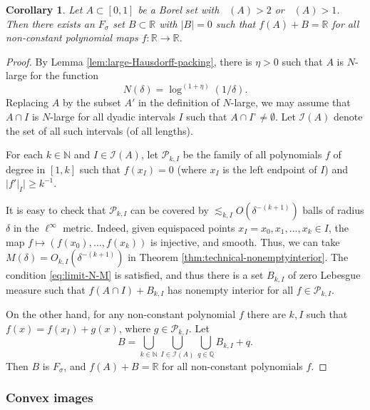 \documentclass[12pt]{amsart}
\DeclareMathOperator{\hlogdim}{dim^{\log}_H}
\DeclareMathOperator{\plogdim}{dim^{\log}_P}
\newtheorem{corollary}[theorem]{Corollary}
\def\R{{\mathbb{R}}}
\def\N{{\mathbb{N}}}
\numberwithin{theorem}{section}
\numberwithin{equation}{section}
\begin{document}
\begin{corollary} \label{cor:polynomial-images}
    Let $A\subset [0,1]$ be a Borel set with $\plogdim(A)>2$ or $\hlogdim(A)>1$. Then there exists an $F_\sigma$ set $B\subset \R$ with $|B|=0$ such that $f(A)+B=\R$ for all non-constant polynomial maps $f:\R\to \R$.
\end{corollary}
\begin{proof}
    By Lemma \ref{lem:large-Hausdorff-packing}, there is $\eta>0$ such that $A$ is $N$-large for the function
    \[
        N(\delta) = \log^{(1+\eta)}(1/\delta).
    \]
    Replacing $A$ by the subset $A'$ in the definition of $N$-large, we may assume that $A\cap I$ is $N$-large for all dyadic intervals $I$ such that $A\cap I^\circ\neq\emptyset$. Let $\mathcal{I}(A)$ denote the set of all such intervals (of all lengths).

    For each $k\in\N$ and $I\in\mathcal{I}(A)$, let $\mathcal{P}_{k,I}$ be the family of all polynomials $f$ of degree in $[1,k]$ such that $f(x_I)=0$ (where $x_I$ is the left endpoint of $I$) and $|f'|_I| \ge k^{-1}$.

    It is easy to check that $\mathcal{P}_{k,I}$ can be covered by $\lesssim_{k,I} O(\delta^{-(k+1)})$ balls of radius $\delta$ in the $\ell^\infty$ metric. Indeed, given equispaced points $x_I=x_0,x_1,\ldots,x_{k}\in I$, the map $f\mapsto (f(x_0),\ldots,f(x_{k}))$ is injective, and smooth. Thus, we can take $M(\delta)=O_{k,I}(\delta^{-(k+1)})$ in Theorem \ref{thm:technical-nonemptyinterior}. The condition \eqref{eq:limit-N-M} is satisfied, and thus there is a set $B_{k,I}$ of zero Lebesgue measure such that $f(A\cap I)+B_{k,I}$ has nonempty interior for all $f\in\mathcal{P}_{k,I}$.

    On the other hand, for any non-constant polynomial $f$ there are $k,I$ such that $f(x)=f(x_I)+g(x)$, where $g\in\mathcal{P}_{k,I}$. Let
    \[
        B = \bigcup_{k\in\N}\bigcup_{I\in\mathcal{I}(A)} \bigcup_{q\in\mathbb{Q}} B_{k,I} + q.
    \]
    Then $B$ is $F_\sigma$, and $f(A)+B=\R$ for all non-constant polynomials $f$.
\end{proof}

\subsubsection{Convex images}
\end{document}
